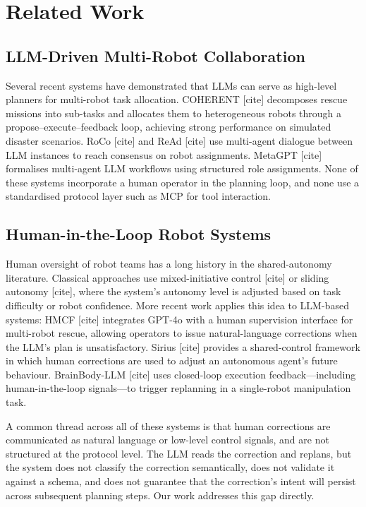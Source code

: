 \section{Related Work}

\subsection{LLM-Driven Multi-Robot Collaboration}

Several recent systems have demonstrated that LLMs can serve as high-level planners for multi-robot task allocation. COHERENT [cite] decomposes rescue missions into sub-tasks and allocates them to heterogeneous robots through a propose–execute–feedback loop, achieving strong performance on simulated disaster scenarios. RoCo [cite] and ReAd [cite] use multi-agent dialogue between LLM instances to reach consensus on robot assignments. MetaGPT [cite] formalises multi-agent LLM workflows using structured role assignments. None of these systems incorporate a human operator in the planning loop, and none use a standardised protocol layer such as MCP for tool interaction.

\subsection{Human-in-the-Loop Robot Systems}
Human oversight of robot teams has a long history in the shared-autonomy literature. Classical approaches use mixed-initiative control [cite] or sliding autonomy [cite], where the system's autonomy level is adjusted based on task difficulty or robot confidence. More recent work applies this idea to LLM-based systems: HMCF [cite] integrates GPT-4o with a human supervision interface for multi-robot rescue, allowing operators to issue natural-language corrections when the LLM's plan is unsatisfactory. Sirius [cite] provides a shared-control framework in which human corrections are used to adjust an autonomous agent's future behaviour. BrainBody-LLM [cite] uses closed-loop execution feedback—including human-in-the-loop signals—to trigger replanning in a single-robot manipulation task.

A common thread across all of these systems is that human corrections are communicated as natural language or low-level control signals, and are not structured at the protocol level. The LLM reads the correction and replans, but the system does not classify the correction semantically, does not validate it against a schema, and does not guarantee that the correction's intent will persist across subsequent planning steps. Our work addresses this gap directly.

